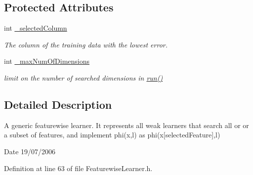 \subsection*{Protected Attributes}
\begin{DoxyCompactItemize}
\item 
\hypertarget{classMultiBoost_1_1FeaturewiseLearner_a3b8cf427791c4d7955234e567b287ec6}{
int \hyperlink{classMultiBoost_1_1FeaturewiseLearner_a3b8cf427791c4d7955234e567b287ec6}{\_\-selectedColumn}}
\label{classMultiBoost_1_1FeaturewiseLearner_a3b8cf427791c4d7955234e567b287ec6}

\begin{DoxyCompactList}\small\item\em The column of the training data with the lowest error. \end{DoxyCompactList}\item 
\hypertarget{classMultiBoost_1_1FeaturewiseLearner_a2105ae344afdcf6096cfd266663b5cb6}{
int \hyperlink{classMultiBoost_1_1FeaturewiseLearner_a2105ae344afdcf6096cfd266663b5cb6}{\_\-maxNumOfDimensions}}
\label{classMultiBoost_1_1FeaturewiseLearner_a2105ae344afdcf6096cfd266663b5cb6}

\begin{DoxyCompactList}\small\item\em limit on the number of searched dimensions in \hyperlink{classMultiBoost_1_1BaseLearner_a525e8f10782055b5c9762318e6e9768e}{run()} \end{DoxyCompactList}\end{DoxyCompactItemize}


\subsection{Detailed Description}
A generic featurewise learner. It represents all weak learners that search all or or a subset of features, and implement phi(x,l) as phi(x\mbox{[}selectedFeature\mbox{]},l)

\begin{DoxyDate}{Date}
19/07/2006 
\end{DoxyDate}


Definition at line 63 of file FeaturewiseLearner.h.



